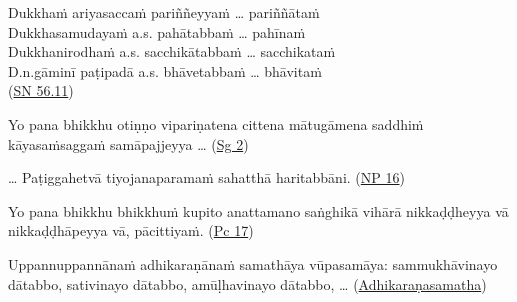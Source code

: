 \documentclass[11pt,oneside]{memoir}
\begin{document}
\begin{widecols}


Dukkhaṁ ariyasaccaṁ pariññeyyaṁ \ldots{} pariññātaṁ \\[0pt]
Dukkhasamudayaṁ a.s. pahātabbaṁ \ldots{} pahīnaṁ \\[0pt]
Dukkhanirodhaṁ a.s. sacchikātabbaṁ \ldots{} sacchikataṁ \\[0pt]
D.n.gāminī paṭipadā a.s. bhāvetabbaṁ \ldots{} bhāvitaṁ \\[0pt]
(\href{https://suttacentral.net/sn56.11/pli/ms}{SN 56.11})

\bigskip

Yo pana bhikkhu otiṇṇo vipariṇatena cittena mātugāmena saddhiṁ kāyasaṁsaggaṁ samāpajjeyya \ldots{} (\href{https://suttacentral.net/pli-tv-bu-vb-ss2/pli/ms}{Sg 2})

\bigskip

\ldots{} Paṭiggahetvā tiyojanaparamaṁ sahatthā haritabbāni. (\href{https://suttacentral.net/pli-tv-bu-vb-np16/pli/ms}{NP 16})

\columnbreak

Yo pana bhikkhu bhikkhuṁ kupito anattamano saṅghikā vihārā nikkaḍḍheyya vā nikkaḍḍhāpeyya vā, pācittiyaṁ. (\href{https://suttacentral.net/pli-tv-bu-vb-pc17/pli/ms}{Pc 17})

\bigskip

Uppannuppannānaṁ adhikaraṇānaṁ samathāya vūpasamāya: sammukhāvinayo dātabbo, sativinayo dātabbo, amūḷhavinayo dātabbo, \ldots{} (\href{https://suttacentral.net/pli-tv-bu-vb-as1-7/pli/ms}{Adhikaraṇasamatha})
\end{widecols}

\bigskip
\end{document}
